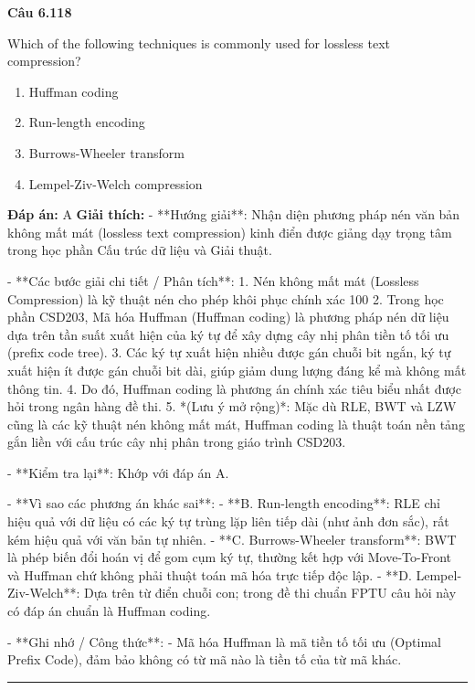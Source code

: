 \documentclass[11pt,a4paper]{article}
\newenvironment{question}[1]{%
  \par\vspace{1em}\noindent\textbf{\large Câu #1}\par\vspace{0.4em}
}{%
  \par\vspace{1em}\hrule\vspace{0.6em}
}
\newenvironment{choices}{%
  \begin{enumerate}[label=\textbf{\Alph*.},leftmargin=2.2em,itemsep=2pt,topsep=3pt]
}{%
  \end{enumerate}
}
\newcommand{\choice}{\item}
\begin{document}
\begin{question}{6.118}
Which of the following techniques is commonly used for lossless text compression?
\begin{choices}
\choice Huffman coding
\choice Run-length encoding
\choice Burrows-Wheeler transform
\choice Lempel-Ziv-Welch compression
\end{choices}
\textbf{Đáp án:} A
\textbf{Giải thích:} - **Hướng giải**:
  Nhận diện phương pháp nén văn bản không mất mát (lossless text compression) kinh điển được giảng dạy trọng tâm trong học phần Cấu trúc dữ liệu và Giải thuật.

- **Các bước giải chi tiết / Phân tích**:
  1. Nén không mất mát (Lossless Compression) là kỹ thuật nén cho phép khôi phục chính xác 100%
  2. Trong học phần CSD203, Mã hóa Huffman (Huffman coding) là phương pháp nén dữ liệu dựa trên tần suất xuất hiện của ký tự để xây dựng cây nhị phân tiền tố tối ưu (prefix code tree).
  3. Các ký tự xuất hiện nhiều được gán chuỗi bit ngắn, ký tự xuất hiện ít được gán chuỗi bit dài, giúp giảm dung lượng đáng kể mà không mất thông tin.
  4. Do đó, Huffman coding là phương án chính xác tiêu biểu nhất được hỏi trong ngân hàng đề thi.
  5. *(Lưu ý mở rộng)*: Mặc dù RLE, BWT và LZW cũng là các kỹ thuật nén không mất mát, Huffman coding là thuật toán nền tảng gắn liền với cấu trúc cây nhị phân trong giáo trình CSD203.

- **Kiểm tra lại**:
  Khớp với đáp án A.

- **Vì sao các phương án khác sai**:
  - **B. Run-length encoding**: RLE chỉ hiệu quả với dữ liệu có các ký tự trùng lặp liên tiếp dài (như ảnh đơn sắc), rất kém hiệu quả với văn bản tự nhiên.
  - **C. Burrows-Wheeler transform**: BWT là phép biến đổi hoán vị để gom cụm ký tự, thường kết hợp với Move-To-Front và Huffman chứ không phải thuật toán mã hóa trực tiếp độc lập.
  - **D. Lempel-Ziv-Welch**: Dựa trên từ điển chuỗi con; trong đề thi chuẩn FPTU câu hỏi này có đáp án chuẩn là Huffman coding.

- **Ghi nhớ / Công thức**:
  - Mã hóa Huffman là mã tiền tố tối ưu (Optimal Prefix Code), đảm bảo không có từ mã nào là tiền tố của từ mã khác.
\end{question}
\end{document}
